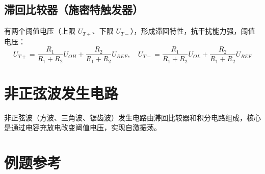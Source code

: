 \subsection{滞回比较器（施密特触发器）}
有两个阈值电压（上限 $U_{T+}$、下限 $U_{T-}$），形成滞回特性，抗干扰能力强，阈值电压：
\[
U_{T+} = \frac{R_1}{R_1+R_2}U_{OH} + \frac{R_2}{R_1+R_2}U_{REF}, \quad U_{T-} = \frac{R_1}{R_1+R_2}U_{OL} + \frac{R_2}{R_1+R_2}U_{REF}
\]

\section{非正弦波发生电路}
非正弦波（方波、三角波、锯齿波）发生电路由滞回比较器和积分电路组成，核心是通过电容充放电改变阈值电压，实现自激振荡。

\section{例题参考}